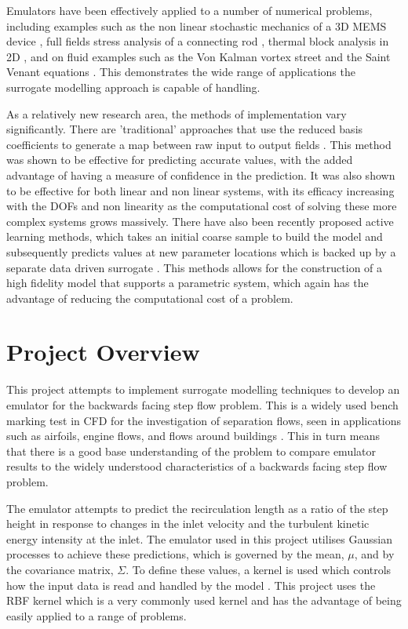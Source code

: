 \documentclass[conference]{IEEEtran}
\begin{document}
Emulators have been effectively applied to a number of numerical problems, including examples such as the non linear stochastic mechanics of a 3D MEMS device \cite{soize_probabilistic-learning-based_2024}, full fields stress analysis of a connecting rod \cite{ding_full-field_2023}, thermal block analysis in 2D \cite{kapadia_active-learning-driven_2024}, and on fluid examples such as the Von Kalman vortex street and the Saint Venant equations \cite{kapadia_active-learning-driven_2024}. This demonstrates the wide range of applications the surrogate modelling approach is capable of handling.

As a relatively new research area, the methods of implementation vary significantly. There are 'traditional' approaches that use the reduced basis coefficients to generate a map between raw input to output fields \cite{ding_full-field_2023}. This method was shown to be effective for predicting accurate values, with the added advantage of having a measure of confidence in the prediction. It was also shown to be effective for both linear and non linear systems, with its efficacy increasing with the DOFs and non linearity as the computational cost of solving these more complex systems grows massively. There have also been recently proposed active learning methods, which takes an initial coarse sample to build the model and subsequently predicts values at new parameter locations which is backed up by a separate data driven surrogate \cite{kapadia_active-learning-driven_2024}. This methods allows for the construction of a high fidelity model that supports a parametric system, which again has the advantage of reducing the computational cost of a problem.


\section{Project Overview}
This project attempts to implement surrogate modelling techniques to develop an emulator for the backwards facing step flow problem. This is a widely used bench marking test in CFD for the investigation of separation flows, seen in applications such as airfoils, engine flows, and flows around buildings \cite{chen_review_2018}. This in turn means that there is a good base understanding of the problem to compare emulator results to the widely understood characteristics of a backwards facing step flow problem.

The emulator attempts to predict the recirculation length as a ratio of the step height in response to changes in the inlet velocity and the turbulent kinetic energy intensity at the inlet. The emulator used in this project utilises Gaussian processes to achieve these predictions, which is governed by the mean, $\mu$, and by the covariance matrix, $\Sigma$. To define these values, a kernel is used which controls how the input data is read and handled by the model \cite{gortler_visual_2019}. This project uses the RBF kernel which is a very commonly used kernel and has the advantage of being easily applied to a range of problems.
\end{document}
